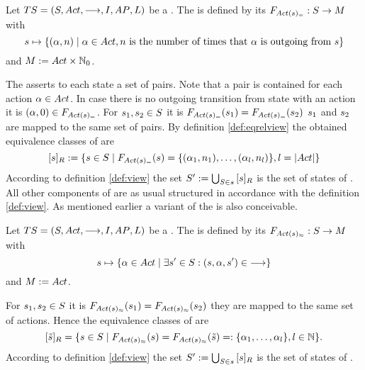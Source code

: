 \documentclass[preview]{standalone}
\begin{document}
\begin{definition}
	Let ${TS} = {({S}, {Act}, {\longrightarrow}, {I}, {AP}, {L})}$ be a \chosengraphtypeN. The \outactidentstrong \outactident \viewNC \viewstrongoutactident is defined by its \grpfctN ${{{{F}}_{{Act}({s})_=}}} : {S} \to {\ensuremath{{M}}}$ with
	\[
	\state \mapsto	
	\{(\action, \numoutact) \mid \action \in \actions, \numoutact \text{ is the number of times that \action is outgoing from } \state\}
	\]
	and ${{M}} := {Act} \times {\mathbb{N}}_0$.
\end{definition}

The \grpfctN asserts to each state a set of pairs. Note that a pair is contained for each action ${\alpha} \in {Act}$. In case there is no outgoing transition from state \state with an action \action it is $(\action, 0) \in \gfctstrongoutactident$. For ${s}_1, {s}_2 \in {S}$ it is ${{{{F}}_{{Act}({s})_=}}}({s}_1) = {{{{F}}_{{Act}({s})_=}}}({s}_2)$ \iffN ${s}_1$ and ${s}_2$ are mapped to the same set of pairs. By definition \ref{def:eqrelview} the obtained equivalence classes of \eqrelview are
\[
	\eqclassv{\state} := \{\state \in \states \mid \gfctstrongoutactident(\state) = \{(\action_1, \numoutact_1), \dots, (\action_l, \numoutact_l)\}, l = |\actions|\}
\]
According to definition \ref{def:view} the set ${S}' := \bigcup_{{S} \in {s}} {{[{s}]_{{R}}}}$ is the set of states of \viewstrongoutactident. All other components of \viewstrongoutactident are as usual structured in accordance with the definition \ref{def:view}.
As mentioned earlier a \outactidentweak variant of the \outactident \viewN is also conceivable.

\begin{definition}
	Let ${TS} = {({S}, {Act}, {\longrightarrow}, {I}, {AP}, {L})}$ be a \chosengraphtypeN. The \outactidentweak \outactident \viewNC \viewweakoutactident is defined by its \grpfctN ${{{{F}}_{{Act}({s})_\approx}}} : {S} \to {\ensuremath{{M}}}$ with
	\[
	{s} \mapsto \{{\alpha} \in {Act} \mid \exists {s}' \in {S} : ({s}, {\alpha}, {s}') \in {\longrightarrow}\} 	
	\]
	and ${{M}} := {Act}$.
\end{definition}

For ${s}_1, {s}_2 \in {S}$ it is ${{{{F}}_{{Act}({s})_\approx}}}({s}_1) = {{{{F}}_{{Act}({s})_\approx}}}({s}_2)$ \iffN they are mapped to the same set of actions. Hence the equivalence classes of \eqrelview are
\[
	\eqclassv{\smstate} = \{ \state \in \states \mid \gfctweakoutactident(\state) = \gfctweakoutactident(\smstate) =: \{\action_1, \dots, \action_l\}, l \in \natnums\}.
\]
According to definition \ref{def:view} the set ${S}' := \bigcup_{{S} \in {s}} {{[{s}]_{{R}}}}$ is the set of states of \viewweakoutactident.
\end{document}
